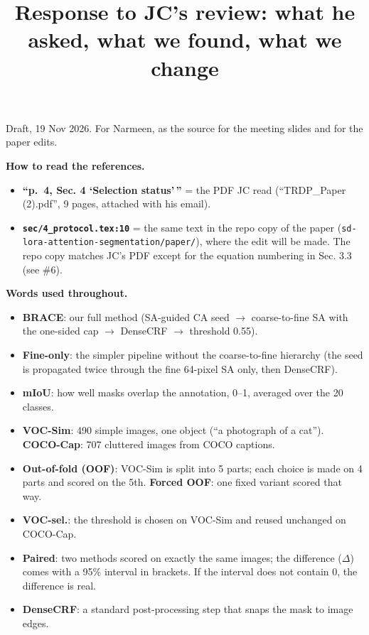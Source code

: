 \documentclass[
  10pt,
]{article}
\title{Response to JC's review: what he asked, what we found, what we
change}
\author{}
\date{}
\providecommand{\tightlist}{%
  \setlength{\itemsep}{0pt}\setlength{\parskip}{0pt}}
\begin{document}
\maketitle

Draft, 19 Nov 2026. For Narmeen, as the source for the meeting slides
and for the paper edits.

\textbf{How to read the references.}

\begin{itemize}
\tightlist
\item
  \textbf{``p.~4, Sec. 4 `Selection status'\,''} = the PDF JC read
  (``TRDP\_Paper (2).pdf'', 9 pages, attached with his email).
\item
  \textbf{\texttt{sec/4\_protocol.tex:10}} = the same text in the repo
  copy of the paper (\texttt{sd-lora-attention-segmentation/paper/}),
  where the edit will be made. The repo copy matches JC's PDF except for
  the equation numbering in Sec. 3.3 (see \#6).
\end{itemize}

\textbf{Words used throughout.}

\begin{itemize}
\tightlist
\item
  \textbf{BRACE}: our full method (SA-guided CA seed \ensuremath{\rightarrow} coarse-to-fine SA
  with the one-sided cap \ensuremath{\rightarrow} DenseCRF \ensuremath{\rightarrow} threshold 0.55).
\item
  \textbf{Fine-only}: the simpler pipeline without the coarse-to-fine
  hierarchy (the seed is propagated twice through the fine 64-pixel SA
  only, then DenseCRF).
\item
  \textbf{mIoU}: how well masks overlap the annotation, 0--1, averaged
  over the 20 classes.
\item
  \textbf{VOC-Sim}: 490 simple images, one object (``a photograph of a
  cat''). \textbf{COCO-Cap}: 707 cluttered images from COCO captions.
\item
  \textbf{Out-of-fold (OOF)}: VOC-Sim is split into 5 parts; each choice
  is made on 4 parts and scored on the 5th. \textbf{Forced OOF}: one
  fixed variant scored that way.
\item
  \textbf{VOC-sel.}: the threshold is chosen on VOC-Sim and reused
  unchanged on COCO-Cap.
\item
  \textbf{Paired}: two methods scored on exactly the same images; the
  difference (\ensuremath{\Delta}) comes with a 95\% interval in brackets. If the interval
  does not contain 0, the difference is real.
\item
  \textbf{DenseCRF}: a standard post-processing step that snaps the mask
  to image edges.
\end{itemize}
\end{document}
